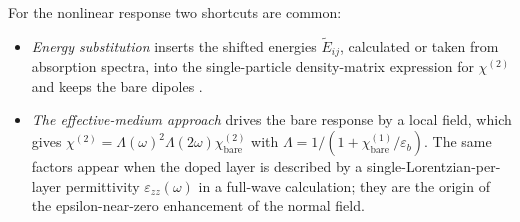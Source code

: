 \documentclass[11pt]{article}
\newcommand{\chitwo}{\chi^{(2)}}
\newcommand{\Et}{\tilde E}
\begin{document}
For the nonlinear response two shortcuts are common:
\begin{itemize}
\item \emph{Energy substitution} inserts the shifted energies $\Et_{ij}$, calculated or taken from absorption spectra, into the single-particle density-matrix expression for $\chitwo$ and keeps the bare dipoles \cite{Vurgaftman1996,Vurgaftman2021}.
\item \emph{The effective-medium approach} drives the bare response by a local field, which gives $\chitwo=\Lambda(\omega)^2\Lambda(2\omega)\chitwo_\mathrm{bare}$ with $\Lambda=1/(1+\chi^{(1)}_\mathrm{bare}/\varepsilon_b)$. The same factors appear when the doped layer is described by a single-Lorentzian-per-layer permittivity $\varepsilon_{zz}(\omega)$ in a full-wave calculation; they are the origin of the epsilon-near-zero enhancement of the normal field.
\end{itemize}
\end{document}
